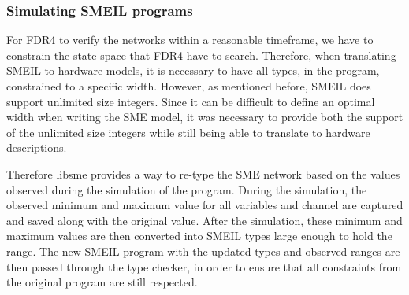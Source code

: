 \subsubsection{Simulating SMEIL programs}
For FDR4 to verify the networks within a reasonable timeframe, we have to constrain the state space that FDR4 have to search. Therefore, when translating SMEIL to hardware models, it is necessary to have all types, in the program, constrained to a specific width. However, as mentioned before, SMEIL does support unlimited size integers. Since it can be difficult to define an optimal width when writing the SME model, it was necessary to provide both the support of the unlimited size integers while still being able to translate to hardware descriptions.

Therefore libsme provides a way to re-type the SME network based on the values observed during the simulation of the program.
During the simulation, the observed minimum and maximum value for all variables and channel are captured and saved along with the original value.
After the simulation, these minimum and maximum values are then converted into SMEIL types large enough to hold the range.
The new SMEIL program with the updated types and observed ranges are then passed through the type checker, in order to ensure that all constraints from the original program are still respected.

